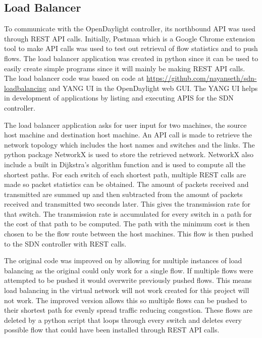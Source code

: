 \subsection{Load Balancer}
To communicate with the OpenDaylight controller, its northbound API was used through REST API calls. Initially, Postman which is a Google Chrome extension tool to make API calls was used to test out retrieval of flow statistics and to push flows. The load balancer application was created in python since it can be used to easily create simple programs since it will mainly be making REST API calls. The load balancer code was based on code at \url{https://github.com/nayanseth/sdn-loadbalancing} and YANG UI in the OpenDaylight web GUI. The YANG UI helps in development of applications by listing and executing APIS for the SDN controller.
\newline
\par
The load balancer application asks for user input for two machines, the source host machine and destination host machine. An API call is made to retrieve the network topology which includes the host names and switches and the links. The python package NetworkX is used to store the retrieved network. NetworkX also include a built in Dijkstra's algorithm function and is used to compute all the shortest paths. For each switch of each shortest path, multiple REST calls are made so packet statistics can be obtained. The amount of packets received and transmitted are summed up and then subtracted from the amount of packets received and transmitted two seconds later. This gives the transmission rate for that switch. The transmission rate is accumulated for every switch in a path for the cost of that path to be computed. The path with the minimum cost is then chosen to be the flow route between the host machines. This flow is then pushed to the SDN controller with REST calls.
\newline
\par
The original code was improved on by allowing for multiple instances of load balancing as the original could only work for a single flow. If multiple flows were attempted to be pushed it would overwrite previously pushed flows. This means load balancing in the virtual network will not work created for this project will not work. The improved version allows this so multiple flows can be pushed to their shortest path for evenly spread traffic reducing congestion. These flows are deleted by a python script that loops through every switch and deletes every possible flow that could have been installed through REST API calls.
